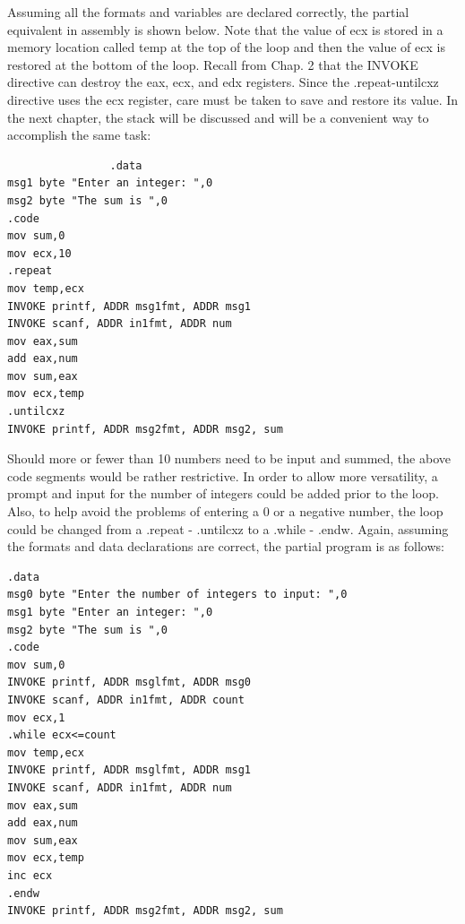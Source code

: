 \documentclass[10pt]{book}
\begin{document}
Assuming all the formats and variables are declared correctly, the partial equivalent in assembly is shown below. Note that the value of ecx is stored in a memory location called temp at the top of the loop and then the value of ecx is restored at the bottom of the loop. Recall from Chap. 2 that the INVOKE directive can destroy the eax, ecx, and edx registers. Since the .repeat-untilcxz directive uses the ecx register, care must be taken to save and restore its value. In the next chapter, the stack will be discussed and will be a convenient way to accomplish the same task:

\begin{verbatim}
                .data
msg1 byte "Enter an integer: ",0
msg2 byte "The sum is ",0
.code
mov sum,0
mov ecx,10
.repeat
mov temp,ecx
INVOKE printf, ADDR msg1fmt, ADDR msg1
INVOKE scanf, ADDR in1fmt, ADDR num
mov eax,sum
add eax,num
mov sum,eax
mov ecx,temp
.untilcxz
INVOKE printf, ADDR msg2fmt, ADDR msg2, sum
\end{verbatim}

Should more or fewer than 10 numbers need to be input and summed, the above code segments would be rather restrictive. In order to allow more versatility, a prompt and input for the number of integers could be added prior to the loop. Also, to help avoid the problems of entering a 0 or a negative number, the loop could be changed from a .repeat - .untilcxz to a .while - .endw. Again, assuming the formats and data declarations are correct, the partial program is as follows:

\begin{verbatim}
.data
msg0 byte "Enter the number of integers to input: ",0
msg1 byte "Enter an integer: ",0
msg2 byte "The sum is ",0
.code
mov sum,0
INVOKE printf, ADDR msglfmt, ADDR msg0
INVOKE scanf, ADDR in1fmt, ADDR count
mov ecx,1
.while ecx<=count
mov temp,ecx
INVOKE printf, ADDR msglfmt, ADDR msg1
INVOKE scanf, ADDR in1fmt, ADDR num
mov eax,sum
add eax,num
mov sum,eax
mov ecx,temp
inc ecx
.endw
INVOKE printf, ADDR msg2fmt, ADDR msg2, sum
\end{verbatim}
\end{document}
